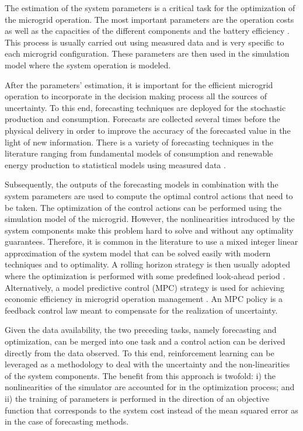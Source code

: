 \documentclass{article}
\begin{document}
	The estimation of the system parameters is a critical task for the optimization of the microgrid operation. The most important parameters are the operation costs as well as the capacities of the different components and the battery efficiency \cite{Parisio2014}. This process is usually carried out using measured data and is very specific to each microgrid configuration. These parameters are then used in the simulation model where the system operation is modeled.

	After the parameters' estimation, it is important for the efficient microgrid operation to incorporate in the decision making process all the sources of uncertainty. To this end, forecasting techniques are deployed for the stochastic production and consumption. Forecasts are collected several times before the physical delivery in order to improve the accuracy of the forecasted value in the light of new information. There is a variety of forecasting techniques in the literature ranging from fundamental models of consumption and renewable energy production \cite{Dolara2015} to statistical models using measured data \cite{Lombardi2019}. 


	Subsequently, the outputs of the forecasting models in combination with the system parameters are used to compute the optimal control actions that need to be taken. The optimization of the control actions can be performed using the simulation model of the microgrid. However, the nonlinearities introduced by the system components make this problem hard to solve and without any optimality guarantees. Therefore, it is common in the literature to use a mixed integer linear approximation of the system model that can be solved easily with modern techniques and to optimality. A rolling horizon strategy is then usually adopted where the optimization is performed with some predefined look-ahead period \cite{Palma-Behnke2013}. Alternatively, a model predictive control (MPC) strategy is used for achieving economic efficiency in microgrid operation management \cite{Parisio2014}. An MPC policy is a feedback control law meant to compensate for the realization of uncertainty.

	Given the data availability, the two preceding tasks, namely forecasting and optimization, can be merged into one task and a control action can be derived directly from the data observed. To this end, reinforcement learning can be leveraged as a methodology to deal with the uncertainty and the non-linearities of the system components. The benefit from this approach is twofold: i) the nonlinearities of the simulator are accounted for in the optimization process; and ii) the training of parameters is performed in the direction of an objective function that corresponds to the system cost instead of the mean squared error as in the case of forecasting methods.
\end{document}
